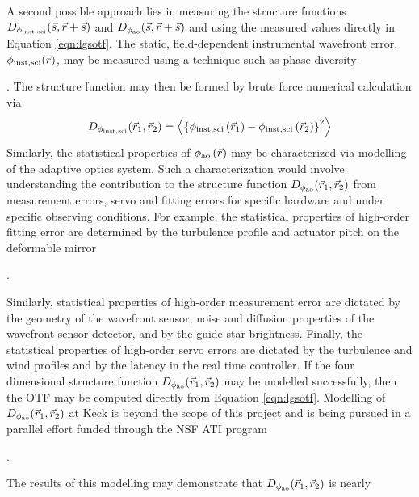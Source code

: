 

A second possible approach lies in measuring the structure functions
$D_{\rm \phi_{inst,sci}}(\vec{s}, \vec{r} +\vec{s} )$ 
and
$D_{\rm \phi_{ao}}(\vec{s}, \vec{r} + \vec{s})$
and using the measured values directly in Equation
\ref{eqn:lgsotf}.  The static, field-dependent instrumental wavefront
error, $\phi_{\rm inst,sci}(\vec{r})$, may be measured using a technique 
such as phase diversity
\begin{notes}
\end{notes}
.  The
structure function may then be formed by brute force numerical
calculation via
\begin{equation}
\label{eqn:strfn_inst}
D_{\rm \phi_{inst,sci}}(\vec{r}_{1}, \vec{r}_{2})  = 
\left\langle \left\{\phi_{\rm inst,sci}\left(\vec{r}_{1}\right) - 
\phi_{\rm inst,sci}\left(\vec{r}_{2}\right)\right\}^{2}\right\rangle
\end{equation}
Similarly, the statistical properties of $\phi_{\rm
  ao}\left(\vec{r}\right)$ may be characterized via modelling
of the adaptive optics system.  Such a characterization would involve
understanding the contribution to the structure function $D_{\rm
  \phi_{ao}}(\vec{r}_{1},\vec{r}_{2})$ from measurement errors,
servo and fitting errors for specific hardware and under specific
observing conditions.  For example, the statistical properties of 
high-order fitting error are determined by the turbulence profile and
actuator pitch on the deformable mirror
\begin{notes}
[CITE].
\end{notes}
Similarly, statistical
properties of high-order measurement error are dictated by the
geometry of the wavefront sensor, noise and diffusion properties of
the wavefront sensor detector, and by the guide star brightness.  Finally,
the statistical properties of high-order servo errors are dictated by the
turbulence and wind profiles and by the latency in the real time
controller.  If the four dimensional structure function $D_{\rm
  \phi_{ao}}(\vec{r}_{1},\vec{r}_{2})$ may be modelled
successfully, then the OTF may be computed
directly from Equation \ref{eqn:lgsotf}.  Modelling of $D_{\rm
  \phi_{ao}}(\vec{r}_{1},\vec{r}_{2})$ at Keck is beyond 
the scope of this project and is being pursued in a parallel effort funded 
through the NSF ATI program 
\begin{notes}
.
\end{notes}
The results of this modelling may demonstrate that 
$D_{\rm \phi_{ao}}(\vec{r}_{1},\vec{r}_{2})$ is nearly
